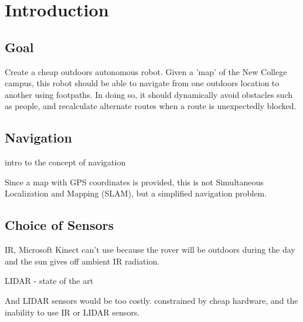 \chapter{Introduction}

\section{Goal}
Create a cheap outdoors autonomous robot. Given a 'map' of the New College campus, this robot should be able to navigate from one outdoors location to another using footpaths. In doing so, it should dynamically avoid obstacles such as people, and recalculate alternate routes when a route is unexpectedly blocked.

\section{Navigation}
intro to the concept of navigation

Since a map with GPS coordinates is provided, this is not Simultaneous Localization and Mapping (SLAM), but a simplified navigation problem. 

\section{Choice of Sensors}
IR, Microsoft Kinect
can't use because the rover will be outdoors during the day and the sun gives off ambient IR radiation.

LIDAR - state of the art

And LIDAR sensors would be too costly. constrained by cheap hardware, and the inability to use IR or LIDAR sensors.
